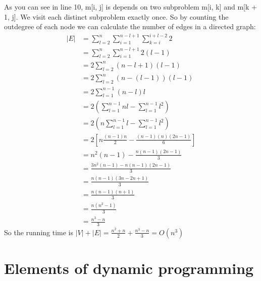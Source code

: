 \documentclass{book}
\begin{document}
	As you can see in line 10, m[i, j] is depends on two subproblem m[i, k] and m[k + 1, j]. We visit each distinct subproblem exactly once. So by counting the outdegree of each node we can calculate the number of edges in a directed graph:
	\begin{equation}
	\begin{split}
	|E| &= \sum_{l = 2}^{n}\sum_{i=1}^{n - l + 1}\sum_{k = i}^{i+l-2}2 \\
	&= \sum_{l=2}^{n}\sum_{i=1}^{n-l+1}2(l-1) \\
	&= 2\sum_{l=2}^{n}(n - l + 1)(l-1) \\
	&= 2\sum_{l=2}^{n}(n -(l - 1))(l-1) \\
	&= 2\sum_{l=1}^{n-1}(n-l)l \\
	&= 2(\sum_{l=1}^{n-1}nl - \sum_{l=1}^{n-1}l^2) \\
	&= 2(n\sum_{l=1}^{n-1}l - \sum_{l=1}^{n-1}l^2) \\
	&= 2[n\frac{(n - 1)n}{2} - \frac{(n - 1)(n)(2n - 1)}{6}] \\
	&= n^2(n - 1) - \frac{n(n-1)(2n-1)}{3} \\
	&= \frac{3n^2(n-1)-n(n-1)(2n-1)}{3} \\
	&= \frac{n(n-1)(3n-2n+1)}{3} \\
	&= \frac{n(n-1)(n+1)}{3}\\
	&= \frac{n(n^2-1)}{3}\\
	&= \frac{n^3 - n}{3}
	\end{split}
	\end{equation}
	So the running time is $|V| + |E| = \frac{n^2 + n}{2} + \frac{n^3 - n}{3} = O(n^3)$
	\section{Elements of dynamic programming}
\end{document}
